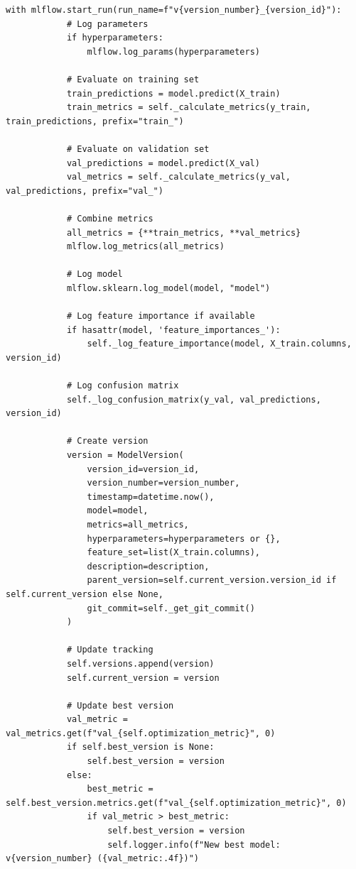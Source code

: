 \begin{lstlisting}[style=python, caption={Iterative Model Development Framework}]
        with mlflow.start_run(run_name=f"v{version_number}_{version_id}"):
            # Log parameters
            if hyperparameters:
                mlflow.log_params(hyperparameters)

            # Evaluate on training set
            train_predictions = model.predict(X_train)
            train_metrics = self._calculate_metrics(y_train, train_predictions, prefix="train_")

            # Evaluate on validation set
            val_predictions = model.predict(X_val)
            val_metrics = self._calculate_metrics(y_val, val_predictions, prefix="val_")

            # Combine metrics
            all_metrics = {**train_metrics, **val_metrics}
            mlflow.log_metrics(all_metrics)

            # Log model
            mlflow.sklearn.log_model(model, "model")

            # Log feature importance if available
            if hasattr(model, 'feature_importances_'):
                self._log_feature_importance(model, X_train.columns, version_id)

            # Log confusion matrix
            self._log_confusion_matrix(y_val, val_predictions, version_id)

            # Create version
            version = ModelVersion(
                version_id=version_id,
                version_number=version_number,
                timestamp=datetime.now(),
                model=model,
                metrics=all_metrics,
                hyperparameters=hyperparameters or {},
                feature_set=list(X_train.columns),
                description=description,
                parent_version=self.current_version.version_id if self.current_version else None,
                git_commit=self._get_git_commit()
            )

            # Update tracking
            self.versions.append(version)
            self.current_version = version

            # Update best version
            val_metric = val_metrics.get(f"val_{self.optimization_metric}", 0)
            if self.best_version is None:
                self.best_version = version
            else:
                best_metric = self.best_version.metrics.get(f"val_{self.optimization_metric}", 0)
                if val_metric > best_metric:
                    self.best_version = version
                    self.logger.info(f"New best model: v{version_number} ({val_metric:.4f})")


\end{lstlisting}
